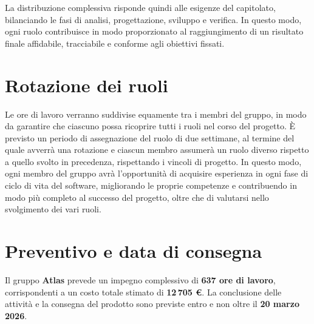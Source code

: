 \documentclass[a4paper,12pt]{article}
\begin{document}
La distribuzione complessiva risponde quindi alle esigenze del capitolato, bilanciando le fasi di analisi, progettazione, sviluppo e verifica.  
In questo modo, ogni ruolo contribuisce in modo proporzionato al raggiungimento di un risultato finale affidabile, tracciabile e conforme agli obiettivi fissati.


\section{Rotazione dei ruoli}
    Le ore di lavoro verranno suddivise equamente tra i membri del gruppo, in modo da garantire che ciascuno possa ricoprire tutti i ruoli nel corso del progetto. È previsto un periodo di assegnazione del ruolo di due settimane, al termine del quale avverrà una rotazione e ciascun membro assumerà un ruolo diverso rispetto a quello svolto in precedenza, rispettando i vincoli di progetto. In questo modo, ogni membro del gruppo avrà l'opportunità di acquisire esperienza in ogni fase di ciclo di vita del software, migliorando le proprie competenze e contribuendo in modo più completo al successo del progetto, oltre che di valutarsi nello svolgimento dei vari ruoli.



\section{Preventivo e data di consegna}
Il gruppo \textbf{Atlas} prevede un impegno complessivo di \textbf{637 ore di lavoro}, corrispondenti a un costo totale stimato di \textbf{12\,705 €}.  
La conclusione delle attività e la consegna del prodotto sono previste entro e non oltre il \textbf{20 marzo 2026}.
 
\end{document}
